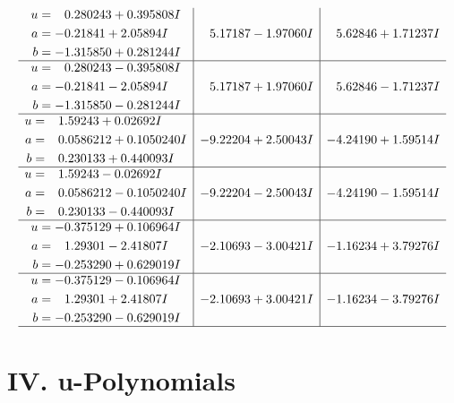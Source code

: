 \documentclass[1p]{elsarticle_modified}
\theoremstyle{definition}
\begin{document}
$$\begin{array}{c|c|c}
\begin{aligned}
u &= \phantom{-}0.280243 + 0.395808 I \\
a &= -0.21841 + 2.05894 I \\
b &= -1.315850 + 0.281244 I\end{aligned}
 & \phantom{-}5.17187 - 1.97060 I & \phantom{-}5.62846 + 1.71237 I \\ \hline\begin{aligned}
u &= \phantom{-}0.280243 - 0.395808 I \\
a &= -0.21841 - 2.05894 I \\
b &= -1.315850 - 0.281244 I\end{aligned}
 & \phantom{-}5.17187 + 1.97060 I & \phantom{-}5.62846 - 1.71237 I \\ \hline\begin{aligned}
u &= \phantom{-}1.59243 + 0.02692 I \\
a &= \phantom{-}0.0586212 + 0.1050240 I \\
b &= \phantom{-}0.230133 + 0.440093 I\end{aligned}
 & -9.22204 + 2.50043 I & -4.24190 + 1.59514 I \\ \hline\begin{aligned}
u &= \phantom{-}1.59243 - 0.02692 I \\
a &= \phantom{-}0.0586212 - 0.1050240 I \\
b &= \phantom{-}0.230133 - 0.440093 I\end{aligned}
 & -9.22204 - 2.50043 I & -4.24190 - 1.59514 I \\ \hline\begin{aligned}
u &= -0.375129 + 0.106964 I \\
a &= \phantom{-}1.29301 - 2.41807 I \\
b &= -0.253290 + 0.629019 I\end{aligned}
 & -2.10693 - 3.00421 I & -1.16234 + 3.79276 I \\ \hline\begin{aligned}
u &= -0.375129 - 0.106964 I \\
a &= \phantom{-}1.29301 + 2.41807 I \\
b &= -0.253290 - 0.629019 I\end{aligned}
 & -2.10693 + 3.00421 I & -1.16234 - 3.79276 I\\
 \hline 
 \end{array}$$\newpage
\newpage\renewcommand{\arraystretch}{1}
\centering \section*{ IV. u-Polynomials}
\end{document}
